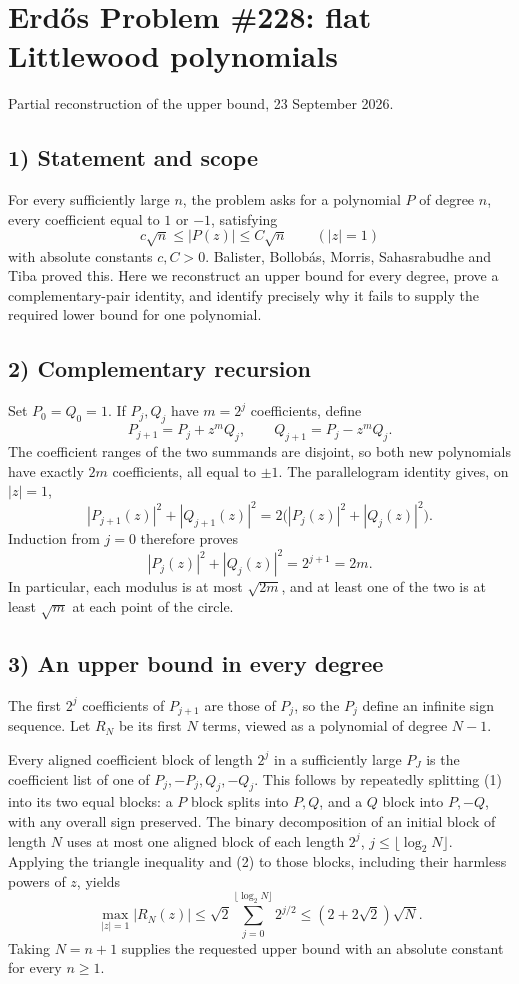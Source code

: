 \section{Erd\H{o}s Problem \#228: flat Littlewood polynomials}
\noindent Partial reconstruction of the upper bound, 23 September 2026.

\subsection*{1) Statement and scope}
For every sufficiently large $n$, the problem asks for a polynomial $P$ of degree $n$, every coefficient equal to $1$ or $-1$, satisfying
\[
 c\sqrt n\le |P(z)|\le C\sqrt n\qquad(|z|=1)
\]
with absolute constants $c,C>0$. Balister, Bollob\'as, Morris, Sahasrabudhe and Tiba proved this. Here we reconstruct an upper bound for every degree, prove a complementary-pair identity, and identify precisely why it fails to supply the required lower bound for one polynomial.

\subsection*{2) Complementary recursion}
Set $P_0=Q_0=1$. If $P_j,Q_j$ have $m=2^j$ coefficients, define
\[
 P_{j+1}=P_j+z^mQ_j,\qquad Q_{j+1}=P_j-z^mQ_j.\tag{1}
\]
The coefficient ranges of the two summands are disjoint, so both new polynomials have exactly $2m$ coefficients, all equal to $\pm1$. The parallelogram identity gives, on $|z|=1$,
\[
 |P_{j+1}(z)|^2+|Q_{j+1}(z)|^2
 =2\bigl(|P_j(z)|^2+|Q_j(z)|^2\bigr).
\]
Induction from $j=0$ therefore proves
\[
 |P_j(z)|^2+|Q_j(z)|^2=2^{j+1}=2m.\tag{2}
\]
In particular, each modulus is at most $\sqrt{2m}$, and at least one of the two is at least $\sqrt m$ at each point of the circle.

\subsection*{3) An upper bound in every degree}
The first $2^j$ coefficients of $P_{j+1}$ are those of $P_j$, so the $P_j$ define an infinite sign sequence. Let $R_N$ be its first $N$ terms, viewed as a polynomial of degree $N-1$.

Every aligned coefficient block of length $2^j$ in a sufficiently large $P_J$ is the coefficient list of one of $P_j,-P_j,Q_j,-Q_j$. This follows by repeatedly splitting (1) into its two equal blocks: a $P$ block splits into $P,Q$, and a $Q$ block into $P,-Q$, with any overall sign preserved. The binary decomposition of an initial block of length $N$ uses at most one aligned block of each length $2^j$, $j\le\lfloor\log_2N\rfloor$. Applying the triangle inequality and (2) to those blocks, including their harmless powers of $z$, yields
\[
 \max_{|z|=1}|R_N(z)|
 \le\sqrt2\sum_{j=0}^{\lfloor\log_2N\rfloor}2^{j/2}
 \le(2+2\sqrt2)\sqrt N.\tag{3}
\]
Taking $N=n+1$ supplies the requested upper bound with an absolute constant for every $n\ge1$.

